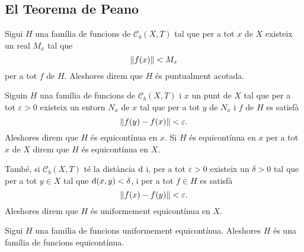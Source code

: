 \documentclass[../../Main.tex]{subfiles}
\begin{document}
	\subsection{El Teorema de Peano}
	\begin{definition}
		\label{def:família de funcions puntualment acotada}
		Sigui \(H\) una família de funcions de \(\mathcal{C}_{b}(X,T)\) tal que per a tot \(x\) de \(X\) existeix un real \(M_{x}\) tal que
		\[
		    \norm{f(x)}<M_{x}
		\]
		per a tot \(f\) de \(H\).
		Aleshores direm que \(H\) és puntualment acotada.
	\end{definition}
	\begin{definition}
		\label{def:família de funcions equicontínua en un punt}
		\label{def:família de funcions equicontínua}
		\label{def:família de funcions uniformement equicontínua}
		Siguin \(H\) una família de funcions de \(\mathcal{C}_{b}(X,T)\) i \(x\) un punt de \(X\) tal que per a tot \(\varepsilon>0\) existeix un entorn \(N_{x}\) de \(x\) tal que per a tot \(y\) de \(N_{x}\) i \(f\) de \(H\) es satisfà
		\[
		    \norm{f(y)-f(x)}<\varepsilon.
		\]
		Aleshores direm que \(H\) és equicontínua en \(x\).
		Si \(H\) és equicontínua en \(x\) per a tot \(x\) de \(X\) direm que \(H\) és equicontínua en \(X\).
		
		També, si \(\mathcal{C}_{b}(X,T)\) té la distància \(\operatorname{d}\) i, per a tot \(\varepsilon>0\) existeix un \(\delta>0\) tal que per a tot \(y\in X\) tal que \(\operatorname{d}(x,y)<\delta\), i per a tot \(f\in H\) es satisfà
		\[
		    \norm{f(x)-f(y)}<\varepsilon.
		\]
		Aleshores direm que \(H\) és uniformement equicontínua en \(X\).
	\end{definition}
	\begin{observation}
		\label{obs:equicontinuitat uniforme implica equicontinuitat}
		Sigui \(H\) una família de funcions uniformement equicontínua.
		Aleshores \(H\) és una família de funcions equicontínua.
	\end{observation}
\end{document}
